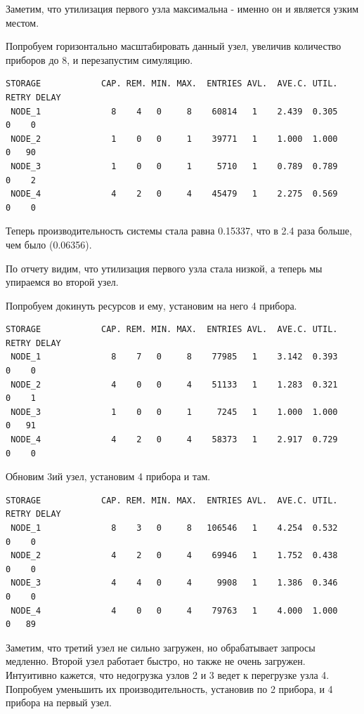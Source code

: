 \documentclass{article}
\begin{document}
Заметим, что утилизация первого узла максимальна - именно он и является узким местом.

Попробуем горизонтально масштабировать данный узел, увеличив количество приборов до 8, и перезапустим симуляцию.

\begin{lstlisting}
STORAGE            CAP. REM. MIN. MAX.  ENTRIES AVL.  AVE.C. UTIL. RETRY DELAY
 NODE_1              8    4   0     8    60814   1    2.439  0.305    0    0
 NODE_2              1    0   0     1    39771   1    1.000  1.000    0   90
 NODE_3              1    0   0     1     5710   1    0.789  0.789    0    2
 NODE_4              4    2   0     4    45479   1    2.275  0.569    0    0
\end{lstlisting}

Теперь производительность системы стала равна 0.15337, что в 2.4 раза больше, чем было (0.06356).

По отчету видим, что утилизация первого узла стала низкой, а теперь мы упираемся во второй узел.

Попробуем докинуть ресурсов и ему, установим на него 4 прибора.

\begin{lstlisting}
STORAGE            CAP. REM. MIN. MAX.  ENTRIES AVL.  AVE.C. UTIL. RETRY DELAY
 NODE_1              8    7   0     8    77985   1    3.142  0.393    0    0
 NODE_2              4    0   0     4    51133   1    1.283  0.321    0    1
 NODE_3              1    0   0     1     7245   1    1.000  1.000    0   91
 NODE_4              4    2   0     4    58373   1    2.917  0.729    0    0
\end{lstlisting}

Обновим 3ий узел, установим 4 прибора и там.

\begin{lstlisting}
STORAGE            CAP. REM. MIN. MAX.  ENTRIES AVL.  AVE.C. UTIL. RETRY DELAY
 NODE_1              8    3   0     8   106546   1    4.254  0.532    0    0
 NODE_2              4    2   0     4    69946   1    1.752  0.438    0    0
 NODE_3              4    4   0     4     9908   1    1.386  0.346    0    0
 NODE_4              4    0   0     4    79763   1    4.000  1.000    0   89
\end{lstlisting}

Заметим, что третий узел не сильно загружен, но обрабатывает запросы медленно. Второй узел работает быстро, но также не очень загружен. Интуитивно кажется, что недогрузка узлов 2 и 3 ведет к перегрузке узла 4. Попробуем уменьшить их производительность, установив по 2 прибора, и 4 прибора на первый узел.
\end{document}
